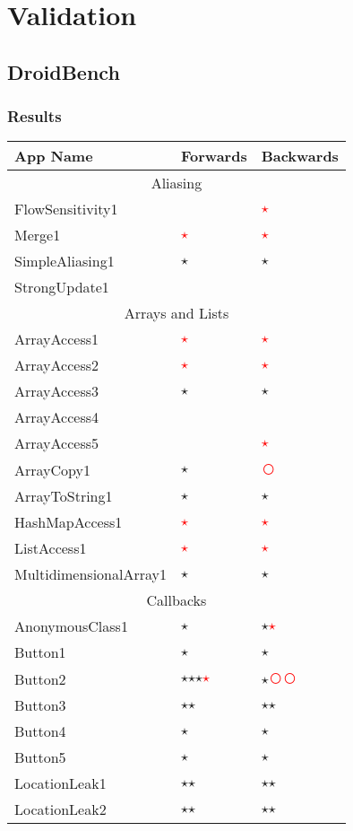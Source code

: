 \documentclass[../draft.tex]{subfiles}
\newcommand{\fp}{\textcolor{white}{\textcircled{\textcolor{red}{$\star$}}}}
\newcommand{\fn}{\textcolor{red}{\textcircled{ }}}
\newcommand{\tp}[0]{\textcircled{$\star$}}
\newcommand{\tsub}[1]{\multicolumn{3}{c}{#1}\\\hline}
\begin{document}
    \chapter{Validation}

    \section{DroidBench}
    \subsection{Results}
    \begin{longtable}{l | l | l}
        \textbf{App Name} & \textbf{Forwards} & \textbf{Backwards}\\
        \hline\hline
        \endhead
        \tsub{Aliasing}
        FlowSensitivity1 & & \fp\\
        Merge1 & \fp & \fp\\
        SimpleAliasing1 & \tp & \tp\\
        StrongUpdate1 & &\\
        \hline
        \tsub{Arrays and Lists}
        ArrayAccess1 & \fp & \fp\\
        ArrayAccess2 & \fp & \fp\\
        ArrayAccess3 & \tp & \tp\\
        ArrayAccess4 &  & \\
        ArrayAccess5 &  & \fp\\
        ArrayCopy1 & \tp & \fn\\
        ArrayToString1 & \tp & \tp\\
        HashMapAccess1 & \fp & \fp\\
        ListAccess1 & \fp & \fp \\
        MultidimensionalArray1 & \tp & \tp\\
        \hline
        \tsub{Callbacks}
        AnonymousClass1 & \tp & \tp \fp\\
        Button1 & \tp & \tp \\
        Button2 & \tp \tp \tp \fp & \tp \fn \fn \\
        Button3 & \tp \tp & \tp \tp\\
        Button4 & \tp & \tp\\
        Button5 & \tp & \tp\\
        LocationLeak1 & \tp \tp & \tp \tp\\
        LocationLeak2 & \tp \tp & \tp \tp\\

\end{longtable}
\end{document}
